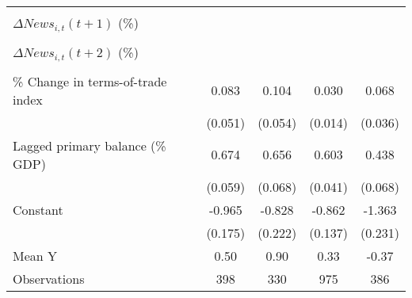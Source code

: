 {\begin{tabular}{l*{4}{c}}
                    &                     &                     &                     &                     \\
\addlinespace
$ \Delta News_{i,t}(t+1)$ (\%)&                     &                     &                     &                     \\
                    &                     &                     &                     &                     \\
\addlinespace
$ \Delta News_{i,t}(t+2)$ (\%)&                     &                     &                     &                     \\
                    &                     &                     &                     &                     \\
\addlinespace
\% Change in terms-of-trade index&       0.083         &       0.104\sym{*}  &       0.030\sym{**} &       0.068\sym{*}  \\
                    &     (0.051)         &     (0.054)         &     (0.014)         &     (0.036)         \\
\addlinespace
Lagged primary balance (\% GDP)&       0.674\sym{***}&       0.656\sym{***}&       0.603\sym{***}&       0.438\sym{***}\\
                    &     (0.059)         &     (0.068)         &     (0.041)         &     (0.068)         \\
\addlinespace
Constant            &      -0.965\sym{***}&      -0.828\sym{***}&      -0.862\sym{***}&      -1.363\sym{***}\\
                    &     (0.175)         &     (0.222)         &     (0.137)         &     (0.231)         \\
\midrule
Mean Y              &        0.50         &        0.90         &        0.33         &       -0.37         \\
Observations        &         398         &         330         &         975         &         386         \\
\bottomrule
\end{tabular}
}
